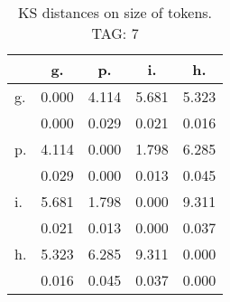 \begin{table}[h!]
\begin{center}
\begin{tabular}{| l | c | c | c | c |}\hline
 & g. & p. & i. & h. \\\hline
g. & 0.000  & 4.114  & 5.681  & 5.323 \\\hline
 & 0.000  & 0.029  & 0.021  & 0.016 \\\hline
p. & 4.114  & 0.000  & 1.798  & 6.285 \\\hline
 & 0.029  & 0.000  & 0.013  & 0.045 \\\hline
i. & 5.681  & 1.798  & 0.000  & 9.311 \\\hline
 & 0.021  & 0.013  & 0.000  & 0.037 \\\hline
h. & 5.323  & 6.285  & 9.311  & 0.000 \\\hline
 & 0.016  & 0.045  & 0.037  & 0.000 \\\hline
\end{tabular}
\caption{KS distances on size of tokens. TAG: 7}
\end{center}
\end{table}